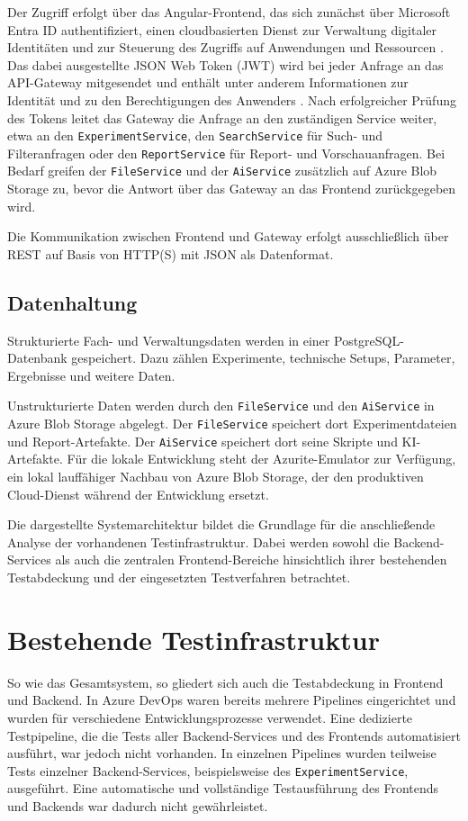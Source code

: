 Der Zugriff erfolgt über das Angular-Frontend, das sich zunächst über Microsoft Entra ID authentifiziert, einen cloudbasierten Dienst zur Verwaltung digitaler Identitäten und zur Steuerung des Zugriffs auf Anwendungen und Ressourcen \cite{MicrosoftEntraWhatIs2026}. Das dabei ausgestellte JSON Web Token (\ac{JWT}) wird bei jeder Anfrage an das \ac{API}-Gateway mitgesendet und enthält unter anderem Informationen zur Identität und zu den Berechtigungen des Anwenders \autocite{JonesBradleySakimura2015}. Nach erfolgreicher Prüfung des Tokens leitet das Gateway die Anfrage an den zuständigen Service weiter, etwa an den \texttt{ExperimentService}, den \texttt{SearchService} für Such- und Filteranfragen oder den \texttt{ReportService} für Report- und Vorschauanfragen. Bei Bedarf greifen der \texttt{FileService} und der \texttt{AiService} zusätzlich auf Azure Blob Storage zu, bevor die Antwort über das Gateway an das Frontend zurückgegeben wird.

Die Kommunikation zwischen Frontend und Gateway erfolgt ausschließlich über \ac{REST} auf Basis von \ac{HTTP}(S) mit \ac{JSON} als Datenformat.


\subsection{Datenhaltung}
Strukturierte Fach- und Verwaltungsdaten werden in einer PostgreSQL-Datenbank gespeichert. Dazu zählen Experimente, technische Setups, Parameter, Ergebnisse und weitere Daten.



Unstrukturierte Daten werden durch den \texttt{FileService} und den \texttt{AiService} in Azure Blob Storage abgelegt. Der \texttt{FileService} speichert dort Experimentdateien und Report-Artefakte. Der \texttt{AiService} speichert dort seine Skripte und KI-Artefakte. 
Für die lokale Entwicklung steht der Azurite-Emulator zur Verfügung, ein lokal lauffähiger Nachbau von Azure Blob Storage, der den produktiven Cloud-Dienst während der Entwicklung ersetzt.

Die dargestellte Systemarchitektur bildet die Grundlage für die anschließende Analyse der vorhandenen Testinfrastruktur. Dabei werden sowohl die Backend-Services als auch die zentralen Frontend-Bereiche hinsichtlich ihrer bestehenden Testabdeckung und der eingesetzten Testverfahren betrachtet.

\section{Bestehende Testinfrastruktur}
\label{sec:bestehende-testinfrastruktur}
So wie das Gesamtsystem, so gliedert sich auch die Testabdeckung in Frontend und Backend. In Azure DevOps waren bereits mehrere Pipelines eingerichtet und wurden für verschiedene Entwicklungsprozesse verwendet. Eine dedizierte Testpipeline, die die Tests aller Backend-Services und des Frontends automatisiert ausführt, war jedoch nicht vorhanden. In einzelnen Pipelines wurden teilweise Tests einzelner Backend-Services, beispielsweise des \texttt{ExperimentService}, ausgeführt. Eine automatische und vollständige Testausführung des Frontends und Backends war dadurch nicht gewährleistet.

